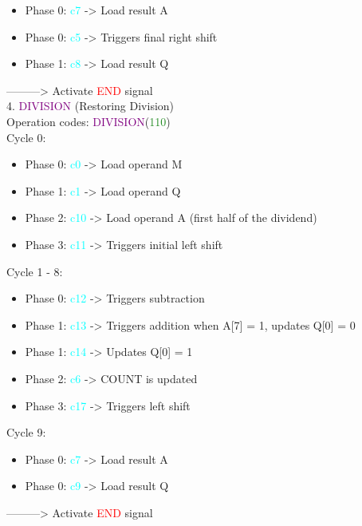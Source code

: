 \documentclass[12pt, letterpaper]{article}
\begin{document}
\begin{itemize} \item Phase 0: \textcolor{cyan}{c7} -> Load result A \item Phase 0: \textcolor{cyan}{c5} -> Triggers final right shift \item Phase 1: \textcolor{cyan}{c8} -> Load result Q \end{itemize} ---------> Activate \textcolor{red}{END} signal\\

4. \textcolor{purple}{DIVISION} (Restoring Division)\\

Operation codes: \textcolor{purple}{DIVISION}(\textcolor{ForestGreen}{110})\\

Cycle 0:

\begin{itemize} \item Phase 0: \textcolor{cyan}{c0} -> Load operand M \item Phase 1: \textcolor{cyan}{c1} -> Load operand Q \item Phase 2: \textcolor{cyan}{c10} -> Load operand A (first half of the dividend) \item Phase 3: \textcolor{cyan}{c11} -> Triggers initial left shift \end{itemize}

Cycle 1 - 8:

\begin{itemize} \item Phase 0: \textcolor{cyan}{c12} -> Triggers subtraction \item Phase 1: \textcolor{cyan}{c13} -> Triggers addition when A[7] = 1, updates Q[0] = 0 \item Phase 1: \textcolor{cyan}{c14} -> Updates Q[0] = 1 \item Phase 2: \textcolor{cyan}{c6} -> COUNT is updated \item Phase 3: \textcolor{cyan}{c17} -> Triggers left shift \end{itemize}

Cycle 9:

\begin{itemize} \item Phase 0: \textcolor{cyan}{c7} -> Load result A \item Phase 0: \textcolor{cyan}{c9} -> Load result Q \end{itemize} ---------> Activate \textcolor{red}{END} signal\
\end{document}
